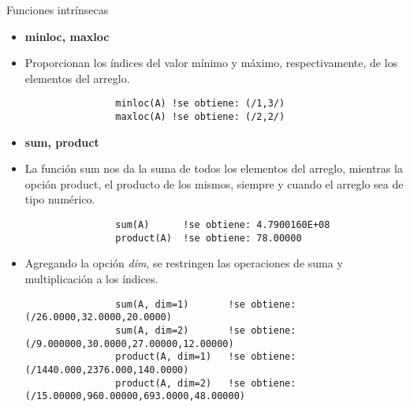 \begin{frame}[fragile]{Funciones intrínsecas} 
    \begin{itemize}[<+(0)->]
        \item [] \textbf{minloc, maxloc}
        \item Proporcionan los índices del valor mínimo y máximo, respectivamente, de los elementos del arreglo.
            \vspace{0.1cm}
            \begin{verbatim}
                minloc(A) !se obtiene: (/1,3/)
                maxloc(A) !se obtiene: (/2,2/)
            \end{verbatim}
        \item [] \textbf{sum, product}
        \item La función sum nos da la suma de todos los elementos del arreglo, mientras la opción product, el producto de los mismos, siempre y cuando el arreglo sea de tipo numérico.
            \vspace{0.1cm}
            \begin{verbatim}
                sum(A)      !se obtiene: 4.7900160E+08
                product(A)  !se obtiene: 78.00000
            \end{verbatim}
        \item [] Agregando la opción \emph{dim}, se restringen las operaciones de suma y multiplicación a los índices.
            \begin{verbatim}
                sum(A, dim=1)       !se obtiene: (/26.0000,32.0000,20.0000)
                sum(A, dim=2)       !se obtiene: (/9.000000,30.0000,27.00000,12.00000)
                product(A, dim=1)   !se obtiene: (/1440.000,2376.000,140.0000)
                product(A, dim=2)   !se obtiene: (/15.00000,960.00000,693.0000,48.00000)
            \end{verbatim}
    \end{itemize}
\end{frame}



